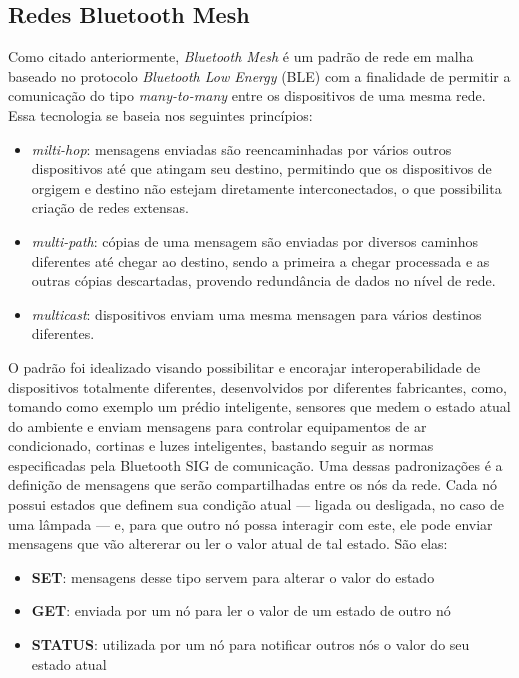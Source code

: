 \documentclass[../monografia.tex]{subfiles}
\begin{document}
\subsection{Redes Bluetooth Mesh}

Como citado anteriormente, \textit{Bluetooth Mesh} é um padrão de rede em malha baseado no protocolo \textit{Bluetooth Low Energy} (BLE) com a finalidade de permitir a comunicação do tipo \textit{many-to-many} entre os dispositivos de uma mesma rede. Essa tecnologia se baseia nos seguintes princípios:

\begin{itemize}
	\item \textit{milti-hop}: mensagens enviadas são reencaminhadas por vários outros dispositivos até que atingam seu destino, permitindo que os dispositivos de orgigem e destino não estejam diretamente interconectados, o que possibilita criação de redes extensas.
	\item \textit{multi-path}: cópias de uma mensagem são enviadas por diversos caminhos diferentes até chegar ao destino, sendo a primeira a chegar processada e as outras cópias descartadas, provendo redundância de dados no nível de rede.
	\item \textit{multicast}: dispositivos enviam uma mesma mensagen para vários destinos diferentes.
\end{itemize}

O padrão foi idealizado visando possibilitar e encorajar interoperabilidade de dispositivos totalmente diferentes, desenvolvidos por diferentes fabricantes, como, tomando como exemplo um prédio inteligente, sensores que medem o estado atual do ambiente e enviam mensagens para controlar equipamentos de ar condicionado, cortinas e luzes inteligentes, bastando seguir as normas especificadas pela Bluetooth SIG de comunicação. Uma dessas padronizações é a definição de mensagens que serão compartilhadas entre os nós da rede. Cada nó possui estados que definem sua condição atual --- ligada ou desligada, no caso de uma lâmpada --- e, para que outro nó possa interagir com este, ele pode enviar mensagens que vão altererar ou ler o valor atual de tal estado. São elas:

\begin{itemize}
	\item \textbf{SET}: mensagens desse tipo servem para alterar o valor do estado
	\item \textbf{GET}: enviada por um nó para ler o valor de um estado de outro nó
	\item \textbf{STATUS}: utilizada por um nó para notificar outros nós o valor do seu estado atual
\end{itemize}
\end{document}
